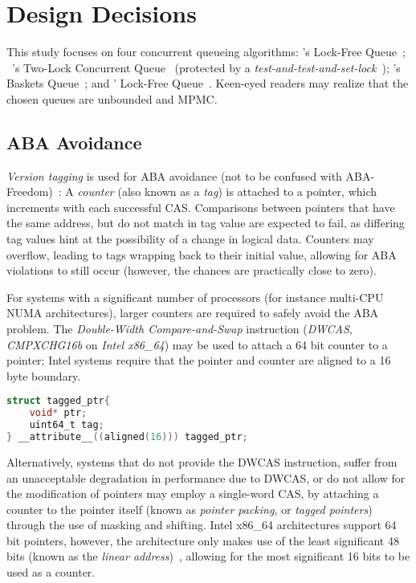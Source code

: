 \section{Design Decisions}
This study focuses on four concurrent queueing algorithms:
\citeauthor{michael1996simple}'s Lock-Free Queue~\citep{michael1996simple};
~\citeauthor{michael1996simple}'s Two-Lock Concurrent
Queue~\citep{michael1996simple} (protected by a \emph{test-and-test-and-set-lock}~\citep{mellor1991algorithms}); \citeauthor{hoffman2007baskets}'s Baskets
Queue~\citep{hoffman2007baskets}; and \citeauthor{valois1994queues}' Lock-Free
Queue~\citep{valois1994queues}. Keen-eyed readers may realize that the chosen
queues are unbounded and MPMC.

\subsection{ABA Avoidance}

\emph{Version tagging} is used for ABA avoidance (not to be confused with
ABA-Freedom)~\citep{dechev2010understanding}:
A \emph{counter} (also known as a \emph{tag}) is attached to a pointer, which increments with
each successful CAS. Comparisons between pointers that have the same address,
but do not match in tag value are expected to fail, as differing tag values hint
at the possibility of a change in logical data. Counters may overflow, leading to tags wrapping back
to their initial value, allowing for ABA violations to still occur (however,
the chances are practically close to zero).

For systems with a significant number of processors (for instance multi-CPU NUMA
architectures), larger counters are required  to safely avoid the ABA problem.
The \emph{Double-Width Compare-and-Swap} instruction (\emph{DWCAS}, \emph{CMPXCHG16b} on
\emph{Intel x86\_64}) may be used to attach a 64 bit counter to a pointer; Intel
systems require that the pointer and counter are aligned to a 16 byte boundary.

\begin{lstlisting}[language=C,caption={Struct aligned to 16 bytes, as required by the DWCAS instruction.}]
struct tagged_ptr{
    void* ptr;
    uint64_t tag;
} __attribute__((aligned(16))) tagged_ptr;
\end{lstlisting}

Alternatively, systems that do not provide the DWCAS instruction, suffer from
an unacceptable degradation in performance due to DWCAS, or do not allow for
the modification of pointers may employ a single-word CAS, by attaching a
counter to the pointer itself (known as \emph{pointer packing}, or \emph{tagged
pointers}) through the use of masking and shifting. Intel x86\_64 architectures support 64 bit pointers, however, the
architecture only makes use of the least significant 48 bits (known as the
\emph{linear address})~\citep[Section~3.3.7.1]{intel2021system}, allowing for
the most significant 16 bits to be used as a counter.

